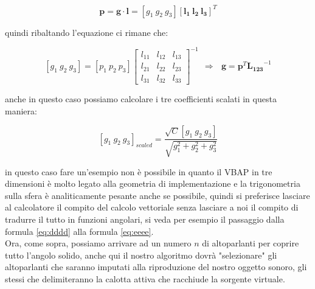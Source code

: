 \documentclass[12pt,a4paper]{report}
\begin{document}
\begin{equation}
\boldsymbol{p} = \boldsymbol{g} \cdot \boldsymbol{l} = \left[ g_1 \ g_2 \ g_3 \right] \left[ \boldsymbol{l_{1}} \ \boldsymbol{l_{2}} \ \boldsymbol{l_{3}} \right]^T
\label{gggg}
\end{equation}

quindi ribaltando l'equazione ci rimane che:

\begin{equation}
\left[g_1 \ g_2 \ g_3 \right] = \left[ p_1 \ p_2 \ p_3 \right]  {\left[\begin{matrix} 
l_{11} & l_{12} & l_{13}\\ l_{21} & l_{22} & l_{23} \\ l_{31} & l_{32} & l_{33}
\end{matrix} \right]}^{-1} \ \ \Rightarrow \ \ \ \boldsymbol{g}=\boldsymbol{p}^T {\boldsymbol{L_{123}}}^{-1}
\label{hhhh}
\end{equation}

anche in questo caso possiamo calcolare i tre coefficienti scalati in questa maniera:

\begin{equation}
\left[g_1 \ g_2 \ g_3 \right]_{scaled} = \dfrac{\sqrt{C} \left[ g_1 \ g_2 \ g_3 \right]}{\sqrt{g_1^2 + g_2^2 + g_3^2}} 
\label{iiii}
\end{equation}

in questo caso fare un'esempio non è possibile in quanto il VBAP in tre dimensioni è molto legato alla geometria di implementazione e la trigonometria sulla sfera è analiticamente pesante anche se possibile, quindi si preferisce lasciare al calcolatore il compito del calcolo vettoriale senza lasciare a noi il compito di tradurre il tutto in funzioni angolari, si veda per esempio il passaggio dalla formula \ref{eq:dddd} alla formula \ref{eq:eeee}.\\

Ora, come sopra, possiamo arrivare ad un numero $n$ di altoparlanti per coprire tutto l'angolo solido, anche qui il nostro algoritmo dovrà "selezionare" gli altoparlanti che saranno imputati alla riproduzione del nostro oggetto sonoro, gli stessi che delimiteranno la calotta attiva che racchiude la sorgente virtuale.
\end{document}
